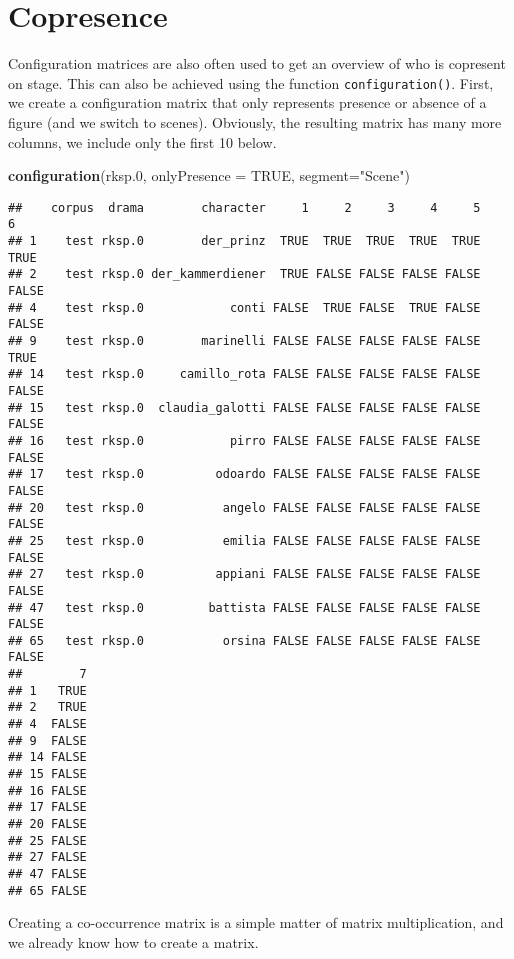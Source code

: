 \documentclass[]{book}
\newenvironment{Shaded}{\begin{snugshade}}{\end{snugshade}}
\newcommand{\DataTypeTok}[1]{\textcolor[rgb]{0.13,0.29,0.53}{#1}}
\newcommand{\FloatTok}[1]{\textcolor[rgb]{0.00,0.00,0.81}{#1}}
\newcommand{\KeywordTok}[1]{\textcolor[rgb]{0.13,0.29,0.53}{\textbf{#1}}}
\newcommand{\NormalTok}[1]{#1}
\newcommand{\OtherTok}[1]{\textcolor[rgb]{0.56,0.35,0.01}{#1}}
\newcommand{\StringTok}[1]{\textcolor[rgb]{0.31,0.60,0.02}{#1}}
\begin{document}
\hypertarget{copresence}{%
\section{Copresence}\label{copresence}}

Configuration matrices are also often used to get an overview of who is copresent on stage. This can also be achieved using the function \texttt{configuration()}. First, we create a configuration matrix that only represents presence or absence of a figure (and we switch to scenes). Obviously, the resulting matrix has many more columns, we include only the first 10 below.

\begin{Shaded}
\begin{Highlighting}[]
\KeywordTok{configuration}\NormalTok{(rksp}\FloatTok{.0}\NormalTok{, }\DataTypeTok{onlyPresence =} \OtherTok{TRUE}\NormalTok{, }\DataTypeTok{segment=}\StringTok{"Scene"}\NormalTok{)}
\end{Highlighting}
\end{Shaded}

\begin{verbatim}
##    corpus  drama        character     1     2     3     4     5     6
## 1    test rksp.0        der_prinz  TRUE  TRUE  TRUE  TRUE  TRUE  TRUE
## 2    test rksp.0 der_kammerdiener  TRUE FALSE FALSE FALSE FALSE FALSE
## 4    test rksp.0            conti FALSE  TRUE FALSE  TRUE FALSE FALSE
## 9    test rksp.0        marinelli FALSE FALSE FALSE FALSE FALSE  TRUE
## 14   test rksp.0     camillo_rota FALSE FALSE FALSE FALSE FALSE FALSE
## 15   test rksp.0  claudia_galotti FALSE FALSE FALSE FALSE FALSE FALSE
## 16   test rksp.0            pirro FALSE FALSE FALSE FALSE FALSE FALSE
## 17   test rksp.0          odoardo FALSE FALSE FALSE FALSE FALSE FALSE
## 20   test rksp.0           angelo FALSE FALSE FALSE FALSE FALSE FALSE
## 25   test rksp.0           emilia FALSE FALSE FALSE FALSE FALSE FALSE
## 27   test rksp.0          appiani FALSE FALSE FALSE FALSE FALSE FALSE
## 47   test rksp.0         battista FALSE FALSE FALSE FALSE FALSE FALSE
## 65   test rksp.0           orsina FALSE FALSE FALSE FALSE FALSE FALSE
##        7
## 1   TRUE
## 2   TRUE
## 4  FALSE
## 9  FALSE
## 14 FALSE
## 15 FALSE
## 16 FALSE
## 17 FALSE
## 20 FALSE
## 25 FALSE
## 27 FALSE
## 47 FALSE
## 65 FALSE
\end{verbatim}

Creating a co-occurrence matrix is a simple matter of matrix multiplication, and we already know how to create a matrix.
\end{document}
